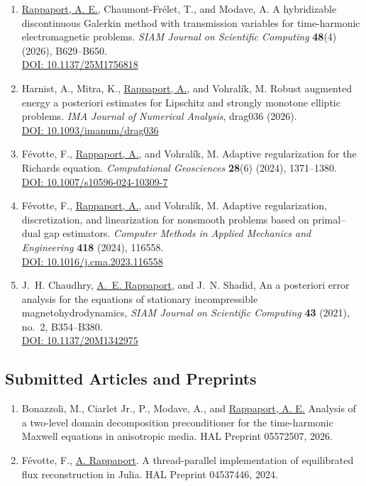 \documentclass[11pt,a4paper,sans]{moderncv}
\newcommand*{\doi}[1]{\href{http://dx.doi.org/#1}{DOI: #1}}
\begin{document}
\begin{enumerate}
    \item \underline{Rappaport, A. E.}, Chaumont-Frélet, T., and Modave, A.
    A hybridizable discontinuous Galerkin method with transmission variables for time-harmonic electromagnetic problems.
    \textit{SIAM Journal on Scientific Computing} \textbf{48}(4) (2026), B629--B650. \\
    \doi{10.1137/25M1756818}
    \item Harnist, A., Mitra, K., \underline{Rappaport, A.}, and Vohralík, M.
    Robust augmented energy a posteriori estimates for Lipschitz and strongly monotone elliptic problems.
    \textit{IMA Journal of Numerical Analysis}, drag036 (2026). \\
    \doi{10.1093/imanum/drag036}
    \item Févotte, F., \underline{Rappaport, A.}, and Vohralík, M.
    Adaptive regularization for the Richards equation.
    \textit{Computational Geosciences} \textbf{28}(6) (2024), 1371--1380. \\
    \doi{10.1007/s10596-024-10309-7}
    \item Févotte, F., \underline{Rappaport, A.}, and Vohralík, M.
    Adaptive regularization, discretization, and linearization for nonsmooth problems based on primal--dual gap estimators.
    \textit{Computer Methods in Applied Mechanics and Engineering} \textbf{418} (2024), 116558. \\
    \doi{10.1016/j.cma.2023.116558}
    \item J.~H. Chaudhry, \underline{A.~E. Rappaport}, and J.~N. Shadid,
    An a posteriori error analysis for the equations of stationary incompressible magnetohydrodynamics,
    \textit{SIAM Journal on Scientific Computing} \textbf{43} (2021), no.~2, B354--B380. \\
    \doi{10.1137/20M1342975}
\end{enumerate}

\subsection{Submitted Articles and Preprints}

\begin{enumerate}[itemsep=1em]
    \item Bonazzoli, M., Ciarlet Jr., P., Modave, A., and \underline{Rappaport, A. E.}
    Analysis of a two-level domain decomposition preconditioner for the time-harmonic Maxwell equations in anisotropic media.
    HAL Preprint 05572507, 2026.

    \item Févotte, F., \underline{A. Rappaport}.
    A thread-parallel implementation of equilibrated flux reconstruction in Julia.
    HAL Preprint 04537446, 2024.
\end{enumerate}
\end{document}

